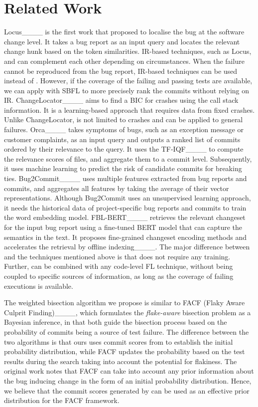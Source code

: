 \section{Related Work}
\label{sec:related_work}

Locus____ is the first work that proposed to localise the bug at the
software change level. It takes a bug report as an input query and locates the
relevant change hunk based on the token similarities. IR-based techniques, such
as Locus, and \name can complement each other depending on circumstances. When
the failure cannot be reproduced from the bug report, IR-based techniques can
be used instead of \name. However, if the coverage of the failing and passing
tests are available, we can apply \name with SBFL to more precisely rank the
commits without relying on IR.
ChangeLocator____ aims to find a BIC for crashes using the call stack
information. It is a learning-based approach that requires data from fixed
crashes. Unlike ChangeLocator, \name is not limited to crashes and can be
applied to general failures. Orca____ takes symptoms of bugs,
such as an exception message or customer complaints, as an input query and
outputs a ranked list of commits ordered by their relevance to the query. It
uses the TF-IQF____ to compute the relevance scores of files, and
aggregate them to a commit level. Subsequently, it uses machine learning to
predict the risk of candidate commits for breaking ties.
Bug2Commit____ uses multiple features extracted from bug reports
and commits, and aggregates all features by taking the average of their vector
representations. Although Bug2Commit uses an unsupervised learning approach, it
needs the historical data of project-specific bug reports and commits to train
the word embedding model. FBL-BERT____ retrieves the relevant
changeset for the input bug report using a fine-tuned BERT model that can
capture the semantics in the text. It proposes fine-grained changeset encoding methods and accelerates the retrieval by offline indexing____. The major difference between \name and the techniques
mentioned above is that \name does not require any training. Further, \name can
be combined with any code-level FL technique, without being coupled to
specific sources of information, as long as the coverage of failing executions
is available.

The weighted bisection algorithm we propose is similar to FACF (Flaky Aware Culprit Finding)____, which formulates the \emph{flake-aware} bisection problem as a Bayesian inference, in that both guide the bisection process based on the probability of commits being a source of test failure. The difference between the two algorithms is that ours uses commit scores from \name to establish the initial probability distribution, while  FACF updates the probability based on the test results during the search taking into account the potential for flakiness. The original work notes that FACF can take into account any prior information about the bug inducing change in the form of an initial probability distribution. Hence, we believe that the commit scores generated by \name can be used as an effective prior distribution for the FACF framework.

